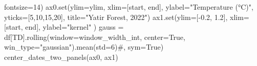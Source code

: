 \documentclass[
  letterpaper,
  DIV=11,
  numbers=noendperiod,
  oneside]{scrreprt}
\newenvironment{Shaded}{\begin{snugshade}}{\end{snugshade}}
\newcommand{\BuiltInTok}[1]{\textcolor[rgb]{0.00,0.23,0.31}{#1}}
\newcommand{\CommentTok}[1]{\textcolor[rgb]{0.37,0.37,0.37}{#1}}
\newcommand{\DecValTok}[1]{\textcolor[rgb]{0.68,0.00,0.00}{#1}}
\newcommand{\FloatTok}[1]{\textcolor[rgb]{0.68,0.00,0.00}{#1}}
\newcommand{\NormalTok}[1]{\textcolor[rgb]{0.00,0.23,0.31}{#1}}
\newcommand{\OperatorTok}[1]{\textcolor[rgb]{0.37,0.37,0.37}{#1}}
\newcommand{\StringTok}[1]{\textcolor[rgb]{0.13,0.47,0.30}{#1}}
\newcommand{\VariableTok}[1]{\textcolor[rgb]{0.07,0.07,0.07}{#1}}
\begin{document}
\begin{Shaded}
\begin{Highlighting}[]
\NormalTok{         fontsize}\OperatorTok{=}\DecValTok{14}\NormalTok{)}
\NormalTok{ax0.}\BuiltInTok{set}\NormalTok{(ylim}\OperatorTok{=}\NormalTok{ylim,}
\NormalTok{        xlim}\OperatorTok{=}\NormalTok{[start, end],}
\NormalTok{        ylabel}\OperatorTok{=}\StringTok{"Temperature (°C)"}\NormalTok{,}
\NormalTok{        yticks}\OperatorTok{=}\NormalTok{[}\DecValTok{5}\NormalTok{,}\DecValTok{10}\NormalTok{,}\DecValTok{15}\NormalTok{,}\DecValTok{20}\NormalTok{],}
\NormalTok{        title}\OperatorTok{=}\StringTok{"Yatir Forest, 2022"}\NormalTok{)}
\NormalTok{ax1.}\BuiltInTok{set}\NormalTok{(ylim}\OperatorTok{=}\NormalTok{[}\OperatorTok{{-}}\FloatTok{0.2}\NormalTok{, }\FloatTok{1.2}\NormalTok{],}
\NormalTok{        xlim}\OperatorTok{=}\NormalTok{[start, end],}
\NormalTok{        ylabel}\OperatorTok{=}\StringTok{"kernel"}
\NormalTok{       )}
\NormalTok{gauss }\OperatorTok{=}\NormalTok{ df[}\StringTok{\textquotesingle{}TD\textquotesingle{}}\NormalTok{].rolling(window}\OperatorTok{=}\NormalTok{window\_width\_int, center}\OperatorTok{=}\VariableTok{True}\NormalTok{, win\_type}\OperatorTok{=}\StringTok{"gaussian"}\NormalTok{).mean(std}\OperatorTok{=}\DecValTok{6}\NormalTok{)}\CommentTok{\#, sym=True)}
\NormalTok{center\_dates\_two\_panels(ax0, ax1)}


\end{Highlighting}
\end{Shaded}
\end{document}

